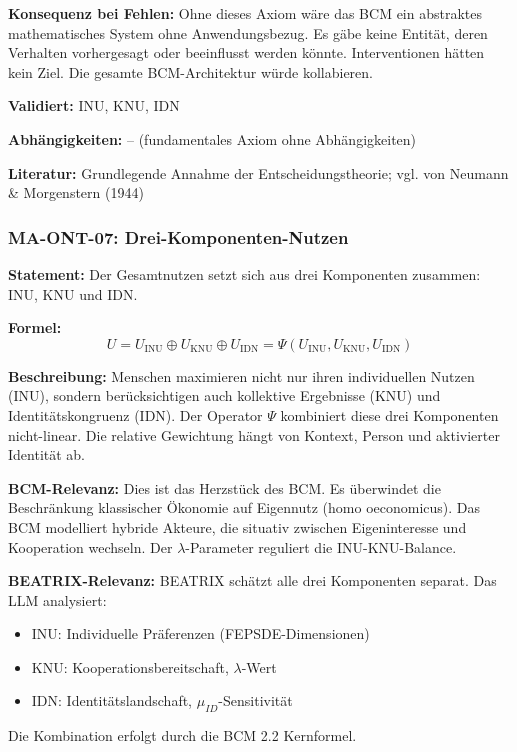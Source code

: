 \textbf{Konsequenz bei Fehlen:}
Ohne dieses Axiom wäre das BCM ein abstraktes mathematisches System ohne Anwendungsbezug. Es gäbe keine Entität, deren Verhalten vorhergesagt oder beeinflusst werden könnte. Interventionen hätten kein Ziel. Die gesamte BCM-Architektur würde kollabieren.

\textbf{Validiert:} INU, KNU, IDN

\textbf{Abhängigkeiten:} -- (fundamentales Axiom ohne Abhängigkeiten)

\textbf{Literatur:} Grundlegende Annahme der Entscheidungstheorie; vgl. von Neumann \& Morgenstern (1944)


\subsubsection*{MA-ONT-07: Drei-Komponenten-Nutzen}

\textbf{Statement:} Der Gesamtnutzen setzt sich aus drei Komponenten zusammen: INU, KNU und IDN.

\textbf{Formel:}
\begin{equation}
U = U_{\text{INU}} \oplus U_{\text{KNU}} \oplus U_{\text{IDN}} = \Psi(U_{\text{INU}}, U_{\text{KNU}}, U_{\text{IDN}})
\end{equation}

\textbf{Beschreibung:}
Menschen maximieren nicht nur ihren individuellen Nutzen (INU), sondern berücksichtigen auch kollektive Ergebnisse (KNU) und Identitätskongruenz (IDN). Der Operator $\Psi$ kombiniert diese drei Komponenten nicht-linear. Die relative Gewichtung hängt von Kontext, Person und aktivierter Identität ab.

\textbf{BCM-Relevanz:}
Dies ist das Herzstück des BCM. Es überwindet die Beschränkung klassischer Ökonomie auf Eigennutz (homo oeconomicus). Das BCM modelliert hybride Akteure, die situativ zwischen Eigeninteresse und Kooperation wechseln. Der $\lambda$-Parameter reguliert die INU-KNU-Balance.

\textbf{BEATRIX-Relevanz:}
BEATRIX schätzt alle drei Komponenten separat. Das LLM analysiert:
\begin{itemize}
    \item INU: Individuelle Präferenzen (FEPSDE-Dimensionen)
    \item KNU: Kooperationsbereitschaft, $\lambda$-Wert
    \item IDN: Identitätslandschaft, $\mu_{ID}$-Sensitivität
\end{itemize}
Die Kombination erfolgt durch die BCM 2.2 Kernformel.

